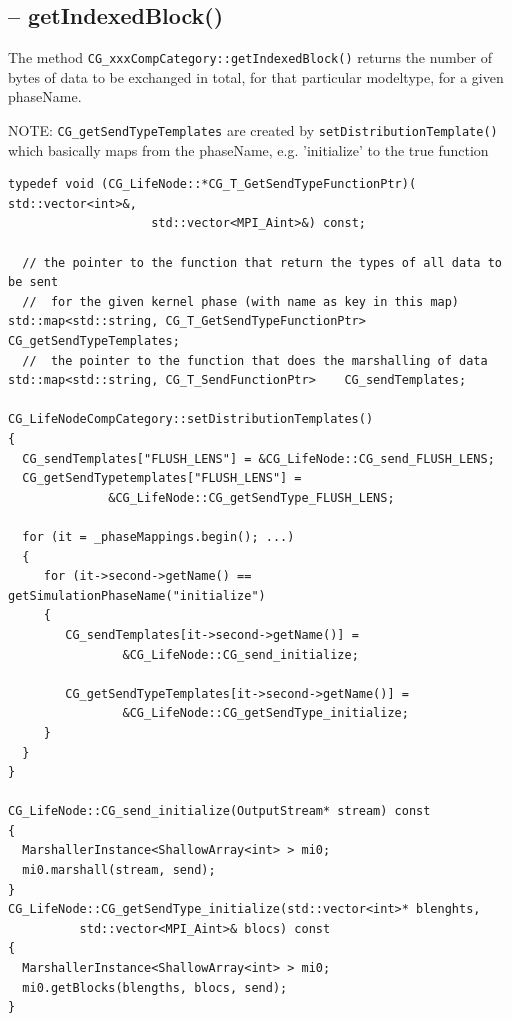 \subsection{-- getIndexedBlock()}
\label{sec:CG_xxxCompCategory::getIndexedBlock}

The method \verb!CG_xxxCompCategory::getIndexedBlock()! returns the number of
bytes of data to be exchanged in total, for that particular modeltype, for a
given phaseName.

NOTE: \verb!CG_getSendTypeTemplates! are created by
\verb!setDistributionTemplate()! which basically maps from the phaseName, e.g.
'initialize' to the true function 

\begin{verbatim}
typedef void (CG_LifeNode::*CG_T_GetSendTypeFunctionPtr)( std::vector<int>&,
                    std::vector<MPI_Aint>&) const;

  // the pointer to the function that return the types of all data to be sent
  //  for the given kernel phase (with name as key in this map)
std::map<std::string, CG_T_GetSendTypeFunctionPtr> CG_getSendTypeTemplates;
  //  the pointer to the function that does the marshalling of data
std::map<std::string, CG_T_SendFunctionPtr>    CG_sendTemplates;

CG_LifeNodeCompCategory::setDistributionTemplates()
{
  CG_sendTemplates["FLUSH_LENS"] = &CG_LifeNode::CG_send_FLUSH_LENS;
  CG_getSendTypetemplates["FLUSH_LENS"] =
              &CG_LifeNode::CG_getSendType_FLUSH_LENS;
  
  for (it = _phaseMappings.begin(); ...) 
  {
     for (it->second->getName() == getSimulationPhaseName("initialize")
     {
        CG_sendTemplates[it->second->getName()] =
                &CG_LifeNode::CG_send_initialize;
                
        CG_getSendTypeTemplates[it->second->getName()] = 
                &CG_LifeNode::CG_getSendType_initialize;
     }
  }
}

CG_LifeNode::CG_send_initialize(OutputStream* stream) const
{ 
  MarshallerInstance<ShallowArray<int> > mi0;
  mi0.marshall(stream, send);
}
CG_LifeNode::CG_getSendType_initialize(std::vector<int>* blenghts,
          std::vector<MPI_Aint>& blocs) const
{
  MarshallerInstance<ShallowArray<int> > mi0;
  mi0.getBlocks(blengths, blocs, send);
}
\end{verbatim}

